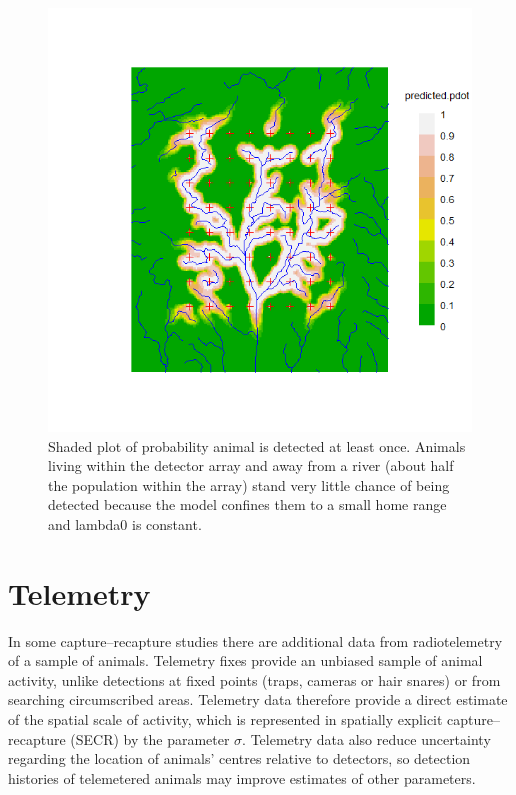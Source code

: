 \documentclass[
]{book}
\begin{document}
\begin{figure}
\includegraphics[width=0.95\linewidth]{figures/predictedpdot} \caption{Shaded plot of probability animal is detected at least once. Animals living within the detector array and away from a river (about half the population within the array) stand very little chance of being detected because the model confines them to a small home range and lambda0 is constant.}\label{fig:predictedpdot}
\end{figure}

\chapter{Telemetry}\label{Telemetry}

In some capture--recapture studies there are additional data from radiotelemetry of a sample of animals. Telemetry fixes provide an unbiased sample of animal activity, unlike detections at fixed points (traps, cameras or hair snares) or from searching circumscribed areas. Telemetry data therefore provide a direct estimate of the spatial scale of activity, which is represented in spatially explicit capture--recapture (SECR) by the parameter \(\sigma\). Telemetry data also reduce uncertainty regarding the location of animals' centres relative to detectors, so detection histories of telemetered animals may improve estimates of other parameters.
\end{document}
